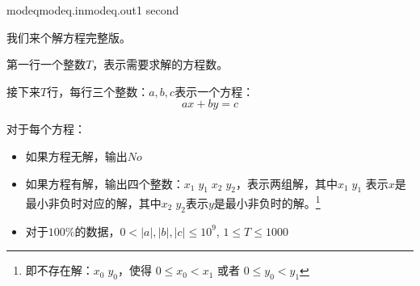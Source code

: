 \documentclass[11pt,a4paper,oneside]{article}
\begin{document}
\begin{problem}{modeq}{modeq.in}{modeq.out}{1 second} 

	我们来个解方程完整版。
	
    \InputFile
	第一行一个整数$ T $，表示需要求解的方程数。
	
	接下来$ T $行，每行三个整数：$ a, b, c $表示一个方程：
	$$
		ax + by = c
	$$

    \OutputFile
	对于每个方程：
	\begin{itemize}
		\item 如果方程无解，输出$No$
		\item 如果方程有解，输出四个整数：$x_1 \; y_1 \;  x_2 \; y_2$，表示两组解，其中$x_1 \; y_1$ 表示$x$是最小非负时对应的解，其中$x_2 \; y_2$表示$y$是最小非负时的解。\footnote{即不存在解：$x_0 \; y_0$，使得 $0 \leq x_0 < x_1$ 或者 $ 0 \leq y_0 < y_1$}
	\end{itemize}

    \Example

    \begin{example}
    \end{example}

    \Note
    
    \begin{itemize}
		\item 对于$100\%$的数据，$0 < \mid a \mid, \mid b \mid, \mid c \mid \leq 10^9 $, $ 1 \leq T \leq 1000$
    \end{itemize}

\end{problem}
\end{document}
